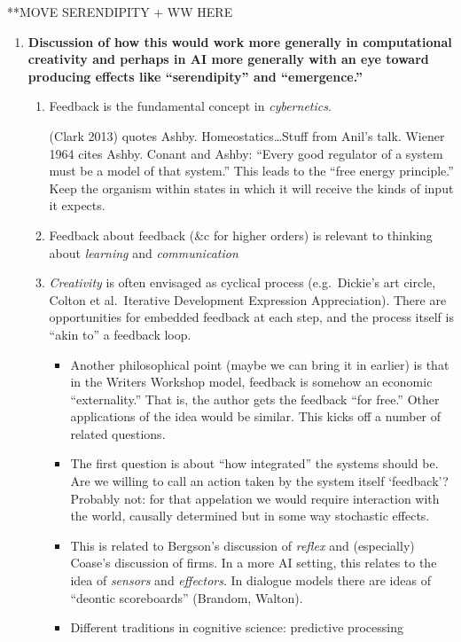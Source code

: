 **MOVE SERENDIPITY + WW HERE

\begin{enumerate}[start=4]
\item \textbf{Discussion of how this would work more generally in
  computational creativity and perhaps in AI more generally with an
  eye toward producing effects like ``serendipity'' and
  ``emergence.''}
\begin{enumerate}
\item Feedback is the fundamental concept in \emph{cybernetics}.  
\begin{itemize}
(Clark 2013) quotes Ashby.  Homeostatics\ldots Stuff from Anil's talk.
  Wiener 1964 cites Ashby.  Conant and Ashby: ``Every good regulator
  of a system must be a model of that system.''  This leads to the
  ``free energy principle.''  Keep the organism within states in which
  it will receive the kinds of input it expects.
\end{itemize}
\item Feedback about feedback (\&c for higher orders) is relevant to thinking about \emph{learning} and \emph{communication}
\item \emph{Creativity} is often envisaged as cyclical process (e.g.~Dickie's
  art circle, Colton et al.~Iterative
  Development Expression Appreciation).  There are opportunities for
  embedded feedback at each step, and the process itself is ``akin
  to'' a feedback loop.
\begin{itemize}
\item Another philosophical point (maybe we can bring it in earlier)
  is that in the Writers Workshop model, feedback is somehow an
  economic ``externality.''  That is, the author gets the feedback
  ``for free.''  Other applications of the idea would be similar.
  This kicks off a number of related questions.
\item The first question is about ``how integrated'' the systems
  should be.  Are we willing to call an action taken by the system
  itself `feedback'?  Probably not: for that appelation we would
  require interaction with the world, causally determined but in some
  way stochastic effects.
\item This is related to Bergson's discussion of \emph{reflex} and
  (especially) Coase's discussion of firms.  In a more AI setting,
  this relates to the idea of \emph{sensors} and \emph{effectors}.  In
  dialogue models there are ideas of ``deontic scoreboards''
  (Brandom, Walton).
\item Different traditions in cognitive science: predictive processing

\end{itemize}
\end{enumerate}
\end{enumerate}
